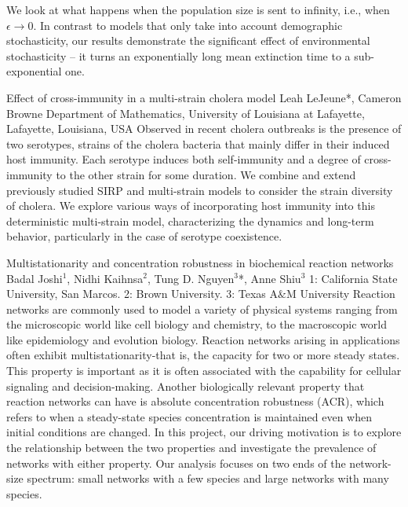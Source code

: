 \begin{addmargin}[2em]{0em}
{We look at what happens when the population size is sent to infinity, i.e., when $\epsilon\to 0$. In contrast to models that only take into account demographic stochasticity, our results demonstrate the significant effect of environmental stochasticity – it turns an exponentially long mean extinction time to a sub-exponential one.}


\vspace{1.5ex}
\abs
{Effect of cross-immunity in a multi-strain cholera model}
{Leah LeJeune{*}, Cameron Browne}
{Department of Mathematics, University of Louisiana at Lafayette, Lafayette, Louisiana, USA}
{Observed in recent cholera outbreaks is the presence of two serotypes, strains of the cholera bacteria that mainly differ in their induced host immunity. Each serotype induces both self-immunity and a degree of cross-immunity to the other strain for some duration. We combine and extend previously studied SIRP and multi-strain models to consider the strain diversity of cholera. We explore various ways of incorporating host immunity into this deterministic multi-strain model, characterizing the dynamics and long-term behavior, particularly in the case of serotype coexistence.}


\vspace{1.5ex}
\abs
{Multistationarity and concentration robustness in biochemical reaction networks}
{Badal Joshi$^{1}$, Nidhi Kaihnsa$^{2}$, Tung D. Nguyen$^{3}$*, Anne Shiu$^{3}$}
{1: California State University, San Marcos. 2: Brown University. 3: Texas A$\&$M University}
{Reaction networks are commonly used to model a variety of physical systems ranging from the microscopic world like cell biology and chemistry, to the macroscopic world like epidemiology and evolution biology. Reaction networks arising in applications often exhibit multistationarity-that is, the capacity for two or more steady states. This property is important as it is often associated with the capability for cellular signaling and decision-making. Another biologically relevant property that reaction networks can have is absolute concentration robustness (ACR), which refers to when a steady-state species concentration is maintained even when initial conditions are changed. In this project, our driving motivation is to explore the relationship between the two properties and investigate the prevalence of networks with either property. Our analysis focuses on two ends of the network-size spectrum: small networks with a few species and large networks with many species.}



\end{addmargin}
